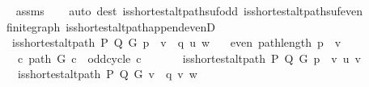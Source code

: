 \begin{isabellebody}
%
\isadelimproof
\ \ %
\endisadelimproof
%
\isatagproof
{}\isamarkupfalse%
\ assms\isanewline
\ \ \isamarkupfalse%
\ {\isacharparenleft}{\kern0pt}auto\ dest{\isacharcolon}{\kern0pt}\ is{\isacharunderscore}{\kern0pt}shortest{\isacharunderscore}{\kern0pt}alt{\isacharunderscore}{\kern0pt}path{\isacharunderscore}{\kern0pt}suf{\isacharunderscore}{\kern0pt}odd\ is{\isacharunderscore}{\kern0pt}shortest{\isacharunderscore}{\kern0pt}alt{\isacharunderscore}{\kern0pt}path{\isacharunderscore}{\kern0pt}suf{\isacharunderscore}{\kern0pt}even{\isacharparenright}{\kern0pt}%
\endisatagproof
{\isafoldproof}%
%
\isadelimproof
\isanewline
%
\endisadelimproof
%
\isadeliminvisible
\isanewline
%
\endisadeliminvisible
%
\isataginvisible
{}\isamarkupfalse%
\ {\isacharparenleft}{\kern0pt}\ finite{\isacharunderscore}{\kern0pt}graph{\isacharparenright}{\kern0pt}\ is{\isacharunderscore}{\kern0pt}shortest{\isacharunderscore}{\kern0pt}alt{\isacharunderscore}{\kern0pt}path{\isacharunderscore}{\kern0pt}append{\isacharunderscore}{\kern0pt}evenD{\isacharcolon}{\kern0pt}\isanewline
\ \ \ {\isachardoublequoteopen}is{\isacharunderscore}{\kern0pt}shortest{\isacharunderscore}{\kern0pt}alt{\isacharunderscore}{\kern0pt}path\ P\ Q\ G\ {\isacharparenleft}{\kern0pt}p\ {\isacharat}{\kern0pt}\ v\ {\isacharhash}{\kern0pt}\ q{\isacharparenright}{\kern0pt}\ u\ w{\isachardoublequoteclose}\isanewline
\ \ \ {\isachardoublequoteopen}even\ {\isacharparenleft}{\kern0pt}path{\isacharunderscore}{\kern0pt}length\ {\isacharparenleft}{\kern0pt}p\ {\isacharat}{\kern0pt}\ {\isacharbrackleft}{\kern0pt}v{\isacharbrackright}{\kern0pt}{\isacharparenright}{\kern0pt}{\isacharparenright}{\kern0pt}{\isachardoublequoteclose}\isanewline
\ \ \ {\isachardoublequoteopen}{\isasymnot}\ {\isacharparenleft}{\kern0pt}{\isasymexists}c{\isachardot}{\kern0pt}\ path\ G\ c\ {\isasymand}\ odd{\isacharunderscore}{\kern0pt}cycle\ c{\isacharparenright}{\kern0pt}{\isachardoublequoteclose}\isanewline
\ \ \isanewline
\ \ \ \ {\isachardoublequoteopen}is{\isacharunderscore}{\kern0pt}shortest{\isacharunderscore}{\kern0pt}alt{\isacharunderscore}{\kern0pt}path\ P\ Q\ G\ {\isacharparenleft}{\kern0pt}p\ {\isacharat}{\kern0pt}\ {\isacharbrackleft}{\kern0pt}v{\isacharbrackright}{\kern0pt}{\isacharparenright}{\kern0pt}\ u\ v{\isachardoublequoteclose}\isanewline
\ \ \ \ {\isachardoublequoteopen}is{\isacharunderscore}{\kern0pt}shortest{\isacharunderscore}{\kern0pt}alt{\isacharunderscore}{\kern0pt}path\ P\ Q\ G\ {\isacharparenleft}{\kern0pt}v\ {\isacharhash}{\kern0pt}\ q{\isacharparenright}{\kern0pt}\ v\ w{\isachardoublequoteclose}\isanewline

\end{isabellebody}
